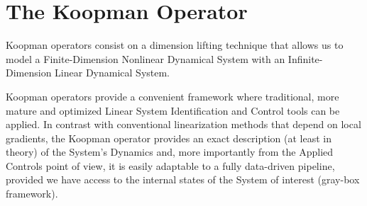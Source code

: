 \documentclass{article}
\begin{document}
\section{The Koopman Operator}

    Koopman operators consist on a dimension lifting technique that allows us to model a Finite-Dimension Nonlinear Dynamical System with an Infinite-Dimension Linear Dynamical System.
    
    Koopman operators provide a convenient framework where traditional, more mature and optimized Linear System Identification and Control tools can be applied. In contrast with conventional linearization methods that depend on local gradients, the Koopman operator provides an exact description (at least in theory) of the System's Dynamics and, more importantly from the Applied Controls point of view, it is easily adaptable to a fully data-driven pipeline, provided we have access to the internal states of the System of interest (gray-box framework).
\end{document}
